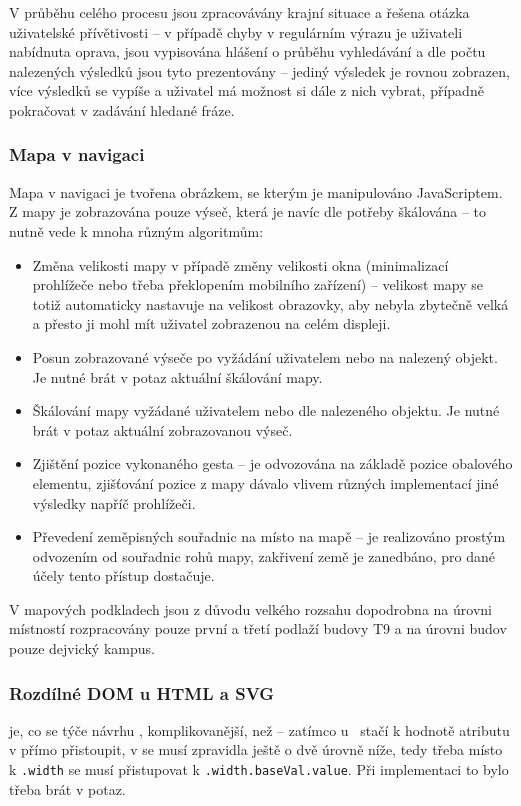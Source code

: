 V průběhu celého procesu jsou zpracovávány krajní situace a řešena otázka uživatelské přívětivosti -- v případě chyby v regulárním výrazu je uživateli nabídnuta oprava, jsou vypisována hlášení o průběhu vyhledávání a dle počtu nalezených výsledků jsou tyto prezentovány -- jediný výsledek je rovnou zobrazen, více výsledků se vypíše a uživatel má možnost si dále z nich vybrat, případně pokračovat v zadávání hledané fráze.

\subsubsection{Mapa v navigaci}
Mapa v navigaci je tvořena  obrázkem, se kterým je manipulováno JavaScriptem. Z mapy je zobrazována pouze výseč, která je navíc dle potřeby škálována -- to nutně vede k mnoha různým algoritmům:
\begin{itemize}
 \item Změna velikosti mapy v případě změny velikosti okna (minimalizací prohlížeče nebo třeba překlopením mobilního zařízení) -- velikost mapy se totiž automaticky nastavuje na velikost obrazovky, aby nebyla zbytečně velká a přesto ji mohl mít uživatel zobrazenou na celém displeji.
 \item Posun zobrazované výseče po vyžádání uživatelem nebo na nalezený objekt. Je nutné brát v potaz aktuální škálování mapy.
 \item Škálování mapy vyžádané uživatelem nebo dle nalezeného objektu. Je nutné brát v potaz aktuální zobrazovanou výseč.
 \item Zjištění pozice vykonaného gesta -- je odvozována na základě pozice obalového elementu, zjišťování pozice z mapy dávalo vlivem různých implementací jiné výsledky napříč prohlížeči.
 \item Převedení zeměpisných souřadnic na místo na mapě -- je realizováno prostým odvozením od souřadnic rohů mapy, zakřivení země je zanedbáno, pro dané účely tento přístup dostačuje.
\end{itemize}
V mapových podkladech jsou z důvodu velkého rozsahu dopodrobna na úrovni místností rozpracovány pouze první a třetí podlaží budovy T9 a na úrovni budov pouze dejvický kampus.


\subsubsection{Rozdílné DOM u HTML a SVG}
 je, co se týče návrhu , komplikovanější, než  -- zatímco u~ stačí k hodnotě atributu v  přímo přistoupit, v  se musí zpravidla ještě o dvě úrovně níže, tedy třeba místo k \texttt{.width} se musí přistupovat k \texttt{.width.baseVal.value}. Při implementaci to bylo třeba brát v potaz.

